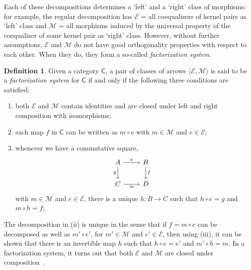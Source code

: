 \documentclass{article}
\theoremstyle{definition}
\newtheorem{defn}{Definition}
\begin{document}
Each of these decompositions determines a ‘left’ and a ‘right’ class of morphisms: for example, the regular decomposition has $\mathcal{E}$ = all coequalizers of kernel pairs as ‘left’ class and $\mathcal{M}$ = all morphisms induced by the universal property of the coequalizer of some kernel pair as ‘right’ class. However, without further assumptions, $\mathcal{E}$ and $\mathcal{M}$ do not have good orthogonality properties with respect to each other. When they do, they form a so-called \textit{factorization system}.
\begin{defn}\label{defn:fact}
Given a category $\mathsf{C}$, a pair of classes of arrows $\langle \mathcal{E},\mathcal{M} \rangle$ is said to be a \emph{factorization system} for $\mathsf{C}$ if and only if the following three conditions are satisfied:%
\begin{enumerate}
    \item[\rm (i)] both $\mathcal{E}$ and $\mathcal{M}$ contain identities and are closed under left and right composition with isomorphisms;
    \item[\rm (ii)] each map $f$ in $\mathsf{C}$ can be written as $m \circ e$ with $m \in \mathcal{M}$ and $e \in \mathcal{E}$;
    \item[\rm (iii)] whenever we have a commutative square,
    \[\begin{tikzcd}[ampersand replacement=\&]
	A \& B \\
	C \& D
	\arrow["e", from=1-1, to=1-2]
	\arrow["g"', from=1-1, to=2-1]
	\arrow["f", from=1-2, to=2-2]
	\arrow["m"', from=2-1, to=2-2]
    \end{tikzcd}\]
    with $m \in \mathcal{M}$ and $e \in \mathcal{E}$, there is a unique $h \colon B \longrightarrow C$ such that $h \circ e = g$ and $m \circ h = f$;
\end{enumerate}
\end{defn}
The decomposition in (ii) is unique in the sense that if $f = m \circ e$ can be decomposed as well as $m' \circ e'$, for $m' \in \mathcal{M}$ and $e' \in \mathcal{E}$, then using (iii), it can be shown that there is an invertible map $h$ such that $h \circ e = e'$ and $m' \circ h = m$. In a factorization system, it turns out that both $\mathcal{E}$ and $\mathcal{M}$ are closed under composition~\cite{Bor}. %
\end{document}
